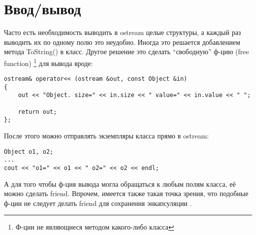 \section{Ввод/вывод}

Часто есть необходимость выводить в ostream целые структуры, а каждый раз выводить их по одному полю это
неудобно. Иногда это решается добавлением метода ToString() в класс. 
Другое решение это сделать ``свободную'' ф-цию (free function)
\footnote{Ф-ции не являющиеся методом какого-либо класса} для вывода вроде:

\begin{lstlisting}
ostream& operator<< (ostream &out, const Object &in)
{
    out << "Object. size=" << in.size << " value=" << in.value << " ";

    return out;
};
\end{lstlisting}

После этого можно отправлять экземпляры класса прямо в ostream:

\begin{lstlisting}
Object o1, o2;
...
cout << "o1=" << o1 << " o2=" << o2 << endl;
\end{lstlisting}

А для того чтобы ф-ция вывода могла обращаться к любым полям класса, её можно сделать friend.
Впрочем, имеется также такая точка зрения, что подобные ф-ции не следует делать friend
для сохранения энкапсуляции
\cite[Item 23 Prefer non-member non-friend functions to member functions]{EffectiveCPP}.
